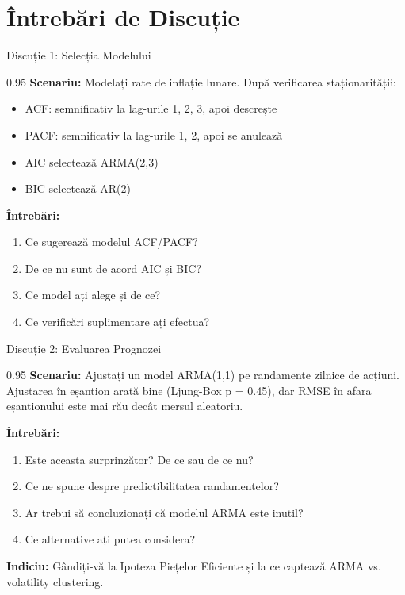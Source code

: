 \documentclass[9pt, aspectratio=169, t]{beamer}
\begin{document}
\section{Întrebări de Discuție}

\begin{frame}{Discuție 1: Selecția Modelului}
    \begin{cminipage}{0.95\textwidth}
    \textbf{Scenariu:} Modelați rate de inflație lunare. După verificarea staționarității:
    \begin{itemize}\setlength{\itemsep}{0pt}
        \item ACF: semnificativ la lag-urile 1, 2, 3, apoi descrește
        \item PACF: semnificativ la lag-urile 1, 2, apoi se anulează
        \item AIC selectează ARMA(2,3)
        \item BIC selectează AR(2)
    \end{itemize}

    \vspace{0.3cm}
    \textbf{Întrebări:}
    \begin{enumerate}\setlength{\itemsep}{0pt}
        \item Ce sugerează modelul ACF/PACF?
        \item De ce nu sunt de acord AIC și BIC?
        \item Ce model ați alege și de ce?
        \item Ce verificări suplimentare ați efectua?
    \end{enumerate}
    \end{cminipage}
\end{frame}

\begin{frame}{Discuție 2: Evaluarea Prognozei}
    \begin{cminipage}{0.95\textwidth}
    \textbf{Scenariu:} Ajustați un model ARMA(1,1) pe randamente zilnice de acțiuni. Ajustarea în eșantion arată bine (Ljung-Box p = 0.45), dar RMSE în afara eșantionului este mai rău decât mersul aleatoriu.

    \vspace{0.3cm}
    \textbf{Întrebări:}
    \begin{enumerate}\setlength{\itemsep}{0pt}
        \item Este aceasta surprinzător? De ce sau de ce nu?
        \item Ce ne spune despre predictibilitatea randamentelor?
        \item Ar trebui să concluzionați că modelul ARMA este inutil?
        \item Ce alternative ați putea considera?
    \end{enumerate}

    \vspace{0.3cm}
    \textbf{Indiciu:} Gândiți-vă la Ipoteza Piețelor Eficiente și la ce captează ARMA vs. volatility clustering.
    \end{cminipage}
\end{frame}
\end{document}
